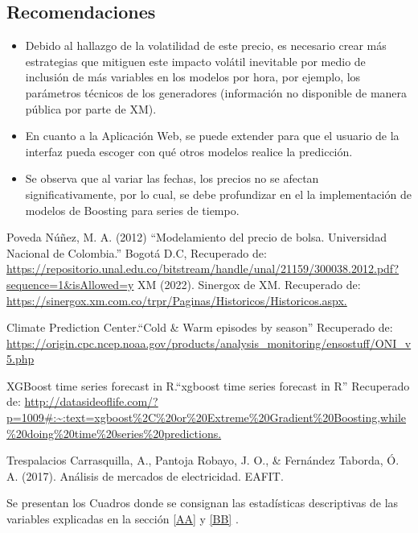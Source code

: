 \documentclass[conference, 10pt]{IEEEtran}
\begin{document}
\subsection{Recomendaciones}
\begin{itemize}
\item Debido al hallazgo de la volatilidad de este precio, es necesario crear más estrategias que mitiguen este impacto volátil inevitable por medio de inclusión de más variables en los modelos por hora, por ejemplo, los parámetros técnicos de los generadores (información no disponible de manera pública por parte de XM).

\item En cuanto a la Aplicación Web, se puede extender para que el usuario de la interfaz pueda escoger con qué otros modelos realice la predicción.
\item Se observa que al variar las fechas, los precios no se afectan significativamente, por lo cual, se debe profundizar en el la implementación de modelos de Boosting para series de tiempo.

\end{itemize}

\begin{thebibliography}{00}
 Poveda Núñez, M. A. (2012) “Modelamiento del precio de bolsa. Universidad Nacional de Colombia.” Bogotá D.C, Recuperado de: \url{https://repositorio.unal.edu.co/bitstream/handle/unal/21159/300038.2012.pdf?sequence=1&isAllowed=y}
 XM (2022). Sinergox de XM. Recuperado de: \url{ https://sinergox.xm.com.co/trpr/Paginas/Historicos/Historicos.aspx.} 

Climate Prediction Center.“Cold \& Warm episodes by season” Recuperado de: \url{https://origin.cpc.ncep.noaa.gov/products/analysis_monitoring/ensostuff/ONI_v5.php}

XGBoost time series forecast in R.“xgboost time series forecast in R” Recuperado de: \url{http://datasideoflife.com/?p=1009#:~:text=xgboost\%2C\%20or\%20Extreme\%20Gradient\%20Boosting,while\%20doing\%20time\%20series\%20predictions.}

Trespalacios Carrasquilla, A., Pantoja Robayo, J. O., \& Fernández Taborda, Ó. A. (2017). Análisis de mercados de electricidad. EAFIT.

\end{thebibliography}


Se presentan los Cuadros donde se consignan las estadísticas descriptivas de las variables explicadas en la sección \ref{AA} y \ref{BB} .\\ 
\end{document}
